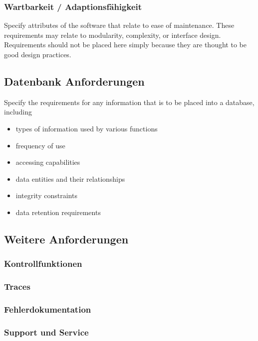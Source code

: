 \subsubsection{Wartbarkeit / Adaptionsfähigkeit}
Specify attributes of the software that relate to ease of maintenance. These requirements may relate to modularity, complexity, or interface design. Requirements should not be placed here simply because they are thought to be good design practices.

\subsection{Datenbank Anforderungen}
Specify the requirements for any information that is to be placed into a database, including
\begin{itemize}
	\item types of information used by various functions
	\item frequency of use
	\item accessing capabilities
	\item data entities and their relationships
	\item integrity constraints
	\item data retention requirements
\end{itemize}

\subsection{Weitere Anforderungen}

\subsubsection{Kontrollfunktionen}

\subsubsection{Traces}

\subsubsection{Fehlerdokumentation}

\subsubsection{Support und Service}

\newpage

